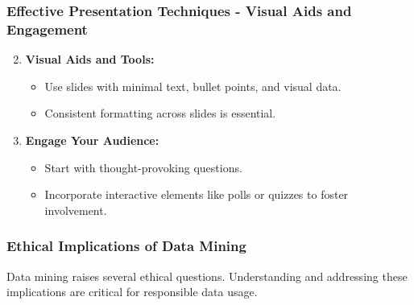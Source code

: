 \documentclass[aspectratio=169]{beamer}
\begin{document}
\begin{frame}[fragile]
    \frametitle{Effective Presentation Techniques - Visual Aids and Engagement}
    \begin{enumerate}
        \setcounter{enumi}{1}
        \item \textbf{Visual Aids and Tools:}
        \begin{itemize}
            \item Use slides with minimal text, bullet points, and visual data.
            \item Consistent formatting across slides is essential.
        \end{itemize}

        \item \textbf{Engage Your Audience:}
        \begin{itemize}
            \item Start with thought-provoking questions.
            \item Incorporate interactive elements like polls or quizzes to foster involvement.
        \end{itemize}
    \end{enumerate}
\end{frame}

\begin{frame}[fragile]
    \frametitle{Ethical Implications of Data Mining}
    Data mining raises several ethical questions. Understanding and addressing these implications are critical for responsible data usage.
\end{frame}
\end{document}
